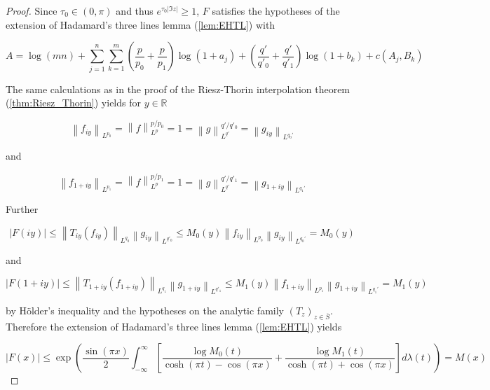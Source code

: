 \begin{proof}
	Since $\tau_0 \in (0,\pi)$ and thus $e^{\tau_0 \left| \Im z\right|} \geq 1$, $F$ satisfies the hypotheses of the extension of Hadamard's three lines lemma (\ref{lem:EHTL}) with 

		\begin{equation*}
		A =  \log\left( mn \right) + \sum_{j = 1}^n\sum_{k = 1}^m\left( \frac{p}{p_0} + \frac{p}{p_1}\right)\log\left(1 + a_j\right) + \left( \frac{q'}{q'_0} + \frac{q'}{q'_1} \right) \log\left( 1 + b_k\right) + c(A_j,B_k)
	\end{equation*}

	The same calculations as in the proof of the Riesz-Thorin interpolation theorem (\ref{thm:Riesz_Thorin}) yields for $y \in \mathbb{R}$

	\begin{equation*}
		\left\| f_{iy}\right\|_{L^{p_0}} = \left\| f\right\|^{p/p_0}_{L^p} = 1 = \left\| g\right\|_{L^{q'}}^{q'/q'_0} = \left\| g_{iy}\right\|_{L^{q_0'}}
	\end{equation*}

	and

	\begin{equation*}
		\left\| f_{1 + iy}\right\|_{L^{p_1}} = \left\| f\right\|^{p/p_1}_{L^p} = 1 = \left\| g\right\|_{L^{q'}}^{q'/q'_1} = \left\| g_{1 + iy}\right\|_{L^{q_1'}}
	\end{equation*}

	Further

	\begin{equation*}
		\left| F(iy)\right| \leq \left\| T_{iy}(f_{iy})\right\|_{L^{q_0}} \left\| g_{iy}\right\|_{L^{q'_0}} \leq M_0(y) \left\|f_{iy}\right\|_{L^{p_0}}\left\| g_{iy}\right\|_{L^{q_0'}} = M_0(y)
	\end{equation*}

	and

	\begin{equation*}
		\left| F(1 + iy)\right| \leq \left\| T_{1 + iy}(f_{1 + iy})\right\|_{L^{q_1}} \left\| g_{1 + iy}\right\|_{L^{q'_1}} \leq M_1(y) \left\|f_{1 + iy}\right\|_{L^{p_1}}\left\| g_{1 + iy}\right\|_{L^{q_1'}} = M_1(y)
	\end{equation*}

	by H\"older's inequality and the hypotheses on the analytic family $(T_z)_{z \in \overline{S}}$. Therefore the extension of Hadamard's three lines lemma (\ref{lem:EHTL}) yields

	\begin{equation*}
		\left| F(x) \right| \leq \exp\left( \frac{\sin(\pi x)}{2} \int_{-\infty}^\infty \left[ \frac{\log M_0(t)}{\cosh(\pi t) - \cos(\pi x)} + \frac{\log M_1(t)}{\cosh(\pi t) + \cos(\pi x)}\right] d\lambda(t) \right) = M(x)
	\end{equation*}


\end{proof}
